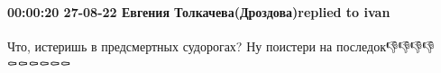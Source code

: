  
 
 
 
 

\paragraph{00:00:20 27-08-22 Евгения Толкачева(Дроздова)replied to ivan}

Что, истеришь в предсмертных судорогах? Ну поистери на последок👎👎👎👎⚰️⚰️⚰️⚰️⚰️⚰️
